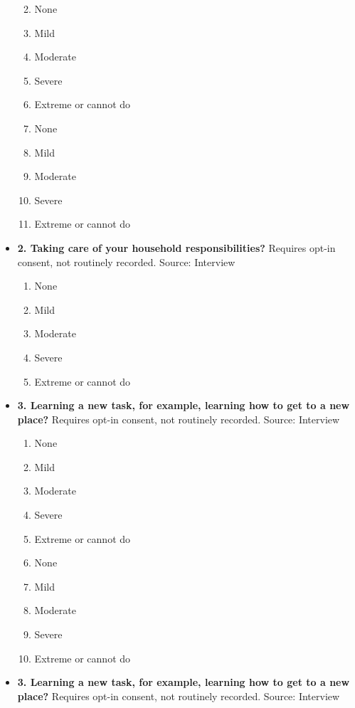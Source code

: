 \documentclass[
]{scrartcl}
\providecommand{\tightlist}{%
  \setlength{\itemsep}{0pt}\setlength{\parskip}{0pt}}\usepackage{longtable,booktabs,array}
\begin{document}
\begin{itemize}
  \begin{enumerate}
  \def\labelenumi{\arabic{enumi}.}
  \tightlist
  \item
    None
  \item
    Mild
  \item
    Moderate
  \item
    Severe
  \item
    Extreme or cannot do
  \item
    None
  \item
    Mild
  \item
    Moderate
  \item
    Severe
  \item
    Extreme or cannot do
  \end{enumerate}
\item
  \textbf{2. Taking care of your household responsibilities?} Requires
  opt-in consent, not routinely recorded. Source: Interview

  \begin{enumerate}
  \def\labelenumi{\arabic{enumi}.}
  \tightlist
  \item
    None
  \item
    Mild
  \item
    Moderate
  \item
    Severe
  \item
    Extreme or cannot do
  \end{enumerate}
\item
  \textbf{3. Learning a new task, for example, learning how to get to a
  new place?} Requires opt-in consent, not routinely recorded. Source:
  Interview

  \begin{enumerate}
  \def\labelenumi{\arabic{enumi}.}
  \tightlist
  \item
    None
  \item
    Mild
  \item
    Moderate
  \item
    Severe
  \item
    Extreme or cannot do
  \item
    None
  \item
    Mild
  \item
    Moderate
  \item
    Severe
  \item
    Extreme or cannot do
  \end{enumerate}
\item
  \textbf{3. Learning a new task, for example, learning how to get to a
  new place?} Requires opt-in consent, not routinely recorded. Source:
  Interview


\end{itemize}
\end{document}
